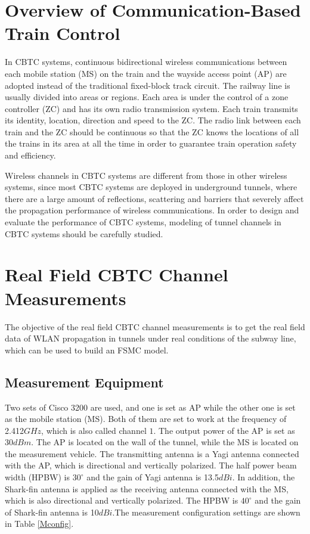 \documentclass[conference]{IEEEtran}
\begin{document}
\section{Overview of Communication-Based Train Control}
\label{OverviewCBTC}
In CBTC systems, continuous bidirectional wireless communications between each mobile station (MS) on the train and the wayside access point (AP) are adopted instead of the traditional fixed-block track circuit. The railway line is usually divided into areas or regions. Each area is under the control of a zone controller (ZC) and has its own radio transmission system. Each train transmits its identity, location, direction and speed to the ZC. The radio link between each train and the ZC should be continuous so that the ZC knows the locations of all the trains in its area at all the time in order to guarantee train operation safety and efficiency.



Wireless channels in CBTC systems are different from those in other wireless systems, since most CBTC systems are deployed in underground tunnels, where there are a large amount of reflections, scattering and barriers that  severely affect the propagation performance of wireless communications. In order to design and evaluate the performance of CBTC systems,  modeling of tunnel channels in CBTC systems should be carefully studied.

\section{Real Field CBTC Channel Measurements}
\label{Sec_Measurement}
The objective of the real field CBTC channel measurements  is to get the real field data of WLAN propagation in tunnels under real conditions of the subway line, which can be used to build an FSMC model.





\subsection{Measurement Equipment}
Two sets of Cisco 3200 are used, and one is set as AP while the other one is set as the mobile station (MS). Both of them are set to work at the frequency of 2.412$GHz$, which is also called channel $1$. The output power of the AP is set as 30$dBm$. The AP is located on the wall of the  tunnel,
while the MS is located on the measurement vehicle. The transmitting antenna is a Yagi antenna connected with the AP, which is directional and vertically polarized. The half power beam width (HPBW) is  $30 ^{\circ}$ and the gain of Yagi antenna is 13.5$dBi$. In addition, the Shark-fin antenna is applied as the receiving antenna connected with the MS, which is also directional and vertically polarized. The HPBW is  $40 ^{\circ}$ and the gain of Shark-fin antenna is 10$dBi$.The measurement configuration settings are shown in Table \ref{Mconfig}.
\end{document}
